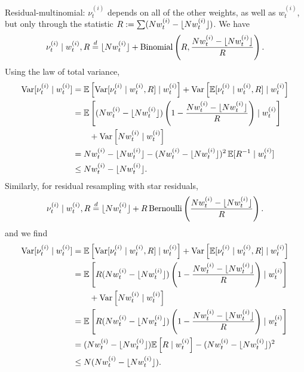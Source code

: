 Residual-multinomial: $\nu_t^{(i)}$ depends on all of the other weights, as well as $w_t^{(i)}$, but only through the statistic $R := \sum (N w_t^{(i)} - \lfloor N w_t^{(i)} \rfloor)$.
We have
\begin{equation}
\nu_t^{(i)} \mid w_t^{(i)} , R
\overset{d}{=} \lfloor N w_t^{(i)} \rfloor + \operatorname{Binomial}\left( R, \frac{Nw_t^{(i)} - \lfloor N w_t^{(i)} \rfloor}{R} \right) .
\end{equation}
Using the law of total variance,
\begin{align*}
\operatorname{Var}[ \nu_t^{(i)} \mid w_t^{(i)} ]
&= \mathbb{E}\left[ \operatorname{Var}[ \nu_t^{(i)} \mid w_t^{(i)}, R ] \mid w_t^{(i)} \right]
        + \operatorname{Var}\left[ \mathbb{E}[ \nu_t^{(i)} \mid w_t^{(i)}, R ] \mid w_t^{(i)} \right] \\
&= \mathbb{E}\left[ (Nw_t^{(i)} - \lfloor N w_t^{(i)} \rfloor) \left( 1- \frac{Nw_t^{(i)} - \lfloor N w_t^{(i)} \rfloor}{R} \right) 
        \mid w_t^{(i)} \right] \\
    &\qquad+ \operatorname{Var}\left[ Nw_t^{(i)} \mid w_t^{(i)} \right] \\
&= Nw_t^{(i)} - \lfloor N w_t^{(i)} \rfloor - (Nw_t^{(i)} - \lfloor N w_t^{(i)} \rfloor)^2\, \mathbb{E}[ R^{-1} \mid w_t^{(i)} ] \\
&\leq Nw_t^{(i)} - \lfloor N w_t^{(i)} \rfloor .
\end{align*}
Similarly, for residual resampling with star residuals,
\begin{equation}
\nu_t^{(i)} \mid w_t^{(i)} , R
\overset{d}{=} \lfloor N w_t^{(i)} \rfloor + R \operatorname{Bernoulli}\left( \frac{Nw_t^{(i)} - \lfloor N w_t^{(i)} \rfloor}{R} \right) .
\end{equation}
and we find
\begin{align*}
\operatorname{Var}[ \nu_t^{(i)} \mid w_t^{(i)} ]
&= \mathbb{E}\left[ \operatorname{Var}[ \nu_t^{(i)} \mid w_t^{(i)}, R ] \mid w_t^{(i)} \right]
        + \operatorname{Var}\left[ \mathbb{E}[ \nu_t^{(i)} \mid w_t^{(i)}, R ] \mid w_t^{(i)} \right] \\
&= \mathbb{E}\left[ R (Nw_t^{(i)} - \lfloor N w_t^{(i)} \rfloor) \left( 1- \frac{Nw_t^{(i)} - \lfloor N w_t^{(i)} \rfloor}{R} \right) 
        \mid w_t^{(i)} \right] \\
    &\qquad+ \operatorname{Var}\left[ Nw_t^{(i)} \mid w_t^{(i)} \right] \\
&= \mathbb{E}\left[ R (Nw_t^{(i)} - \lfloor N w_t^{(i)} \rfloor) \left( 1- \frac{Nw_t^{(i)} - \lfloor N w_t^{(i)} \rfloor}{R} \right) 
        \mid w_t^{(i)} \right] \\
&= (Nw_t^{(i)} - \lfloor N w_t^{(i)} \rfloor) \mathbb{E}\left[ R \mid w_t^{(i)} \right]  - (Nw_t^{(i)} - \lfloor N w_t^{(i)} \rfloor)^2 \\
&\leq N (Nw_t^{(i)} - \lfloor N w_t^{(i)} \rfloor) .
\end{align*}

